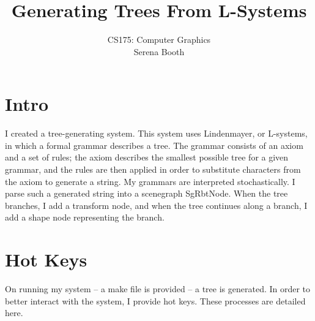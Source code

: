 \documentclass[11pt]{article} %
\title{Generating Trees From L-Systems}
\author{CS175: Computer Graphics \\ Serena Booth}
\begin{document}
\maketitle


\section{Intro} 

I created a tree-generating system. This system uses Lindenmayer, or L-systems, in which a formal grammar describes a tree. The grammar consists of an axiom and a set of rules; the axiom describes the smallest possible tree for a given grammar, and the rules are then applied in order to substitute characters from the axiom to generate a string. My grammars are interpreted stochastically. I parse such a generated string into a scenegraph SgRbtNode. When the tree branches, I add a transform node, and when the tree continues along a branch, I add a shape node representing the branch.  

\section{Hot Keys} 

On running my system -- a make file is provided -- a tree is generated. In order to better interact with the system, I provide hot keys. These processes are detailed here. 
\end{document}
